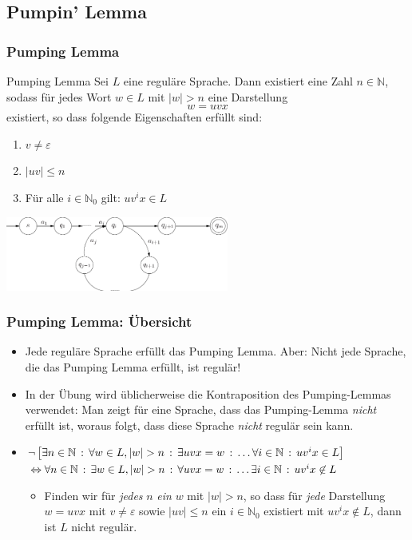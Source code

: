 \subsection{Pumpin' Lemma}
\begin{frame}
\frametitle{Pumping Lemma}
\begin{exampleblock}{Pumping Lemma}
Sei $L$ eine reguläre Sprache. Dann existiert eine Zahl $n \in \mathbb{N}$, sodass für jedes Wort $w \in L$ mit $\left|w \right| > n$ eine Darstellung $$w = uvx$$ existiert, so dass folgende Eigenschaften erfüllt sind:

\begin{enumerate}
\item $v \neq \varepsilon$ 
\item $\left|uv\right| \leq n$ 
\item Für alle $i \in \mathbb{N}_0$ gilt: $uv^ix \in L$
\end{enumerate}
\end{exampleblock}

\begin{center}
\includegraphics[width=0.55\textwidth]{images/Q116}
\end{center}

\end{frame}

\begin{frame}
\frametitle{Pumping Lemma: Übersicht}
\begin{itemize}
\item Jede reguläre Sprache erfüllt das Pumping Lemma. Aber: Nicht jede Sprache, die das Pumping Lemma erfüllt, ist regulär!
\item In der Übung wird üblicherweise die Kontraposition des Pumping-Lemmas verwendet: Man zeigt für eine Sprache, dass das Pumping-Lemma \emph{nicht} erfüllt ist, woraus folgt, dass diese Sprache \emph{nicht} regulär sein kann.

\pause\item $ \neg\left[ \exists n \in \mathbb{N} \,:\, \forall w \in L, |w| > n \,:\, \exists uvx=w \,:\, \ldots \forall i \in \mathbb{N} \,:\, uv^i x \in L\right] $ \\ $ \Leftrightarrow \forall n \in \mathbb{N} \,:\, \exists w \in L, |w| > n \,:\, \forall uvx=w \,:\, \ldots \exists i \in \mathbb{N} \,:\, uv^i x \not\in L $

\pause\begin{itemize}
\item Finden wir für \emph{jedes} $n$ \emph{ein} $w$ mit $\left|w\right| > n$, so dass für \emph{jede} Darstellung $w = uvx$ mit $v \neq \varepsilon$ sowie $\left|uv\right| \leq n$ ein $i \in \mathbb{N}_0$ existiert mit $uv^ix \notin L$, dann ist $L$ nicht regulär.
\end{itemize}
\end{itemize}

\end{frame}

